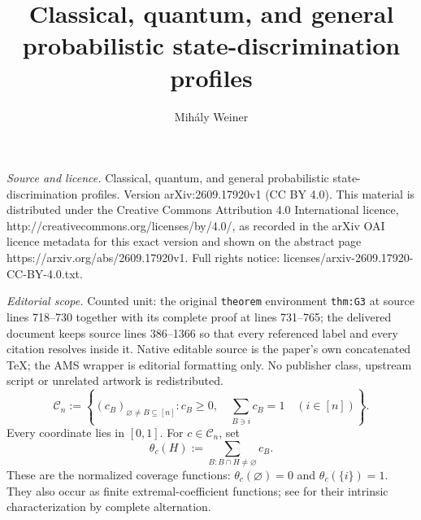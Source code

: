 \documentclass[10pt,a4paper]{amsart}
\newcommand{\1}{\mathbf 1}
\newcommand{\Coeff}{\mathcal C}
\begin{document}
\title[Classical, quantum, and general probabilistic state-discrimi]{Classical, quantum, and general probabilistic state-discrimination profiles}
\author{Mih\'aly Weiner}
\date{}
\maketitle
\noindent\emph{Source and licence.} Classical, quantum, and general probabilistic state-discrimination profiles. Version arXiv:2609.17920v1 (CC BY 4.0). This material is distributed under the Creative Commons Attribution 4.0 International licence, http://creativecommons.org/licenses/by/4.0/, as recorded in the arXiv OAI licence metadata for this exact version and shown on the abstract page https://arxiv.org/abs/2609.17920v1. Full rights notice: licenses/arxiv-2609.17920-CC-BY-4.0.txt.\par\smallskip
\noindent\textit{Editorial scope.} Counted unit: the original \texttt{theorem} environment \texttt{thm:G3} at source lines 718--730 together with its complete proof at lines 731--765; the delivered document keeps source lines 386--1366 so that every referenced label and every citation resolves inside it. Native editable source is the paper's own concatenated TeX; the AMS wrapper is editorial formatting only. No publisher class, upstream script or unrelated artwork is redistributed.
\begin{equation}\label{eq:Coeff}
 \Coeff_n:=\left\{(c_B)_{\varnothing\ne B\subseteq[n]}:
 c_B\ge0,\quad\sum_{B\ni i}c_B=1\quad(i\in[n])\right\}.
\end{equation}
Every coordinate lies in $[0,1]$. For $c\in\Coeff_n$, set
\begin{equation}\label{eq:coverage}
 \theta_c(H):=\sum_{B:B\cap H\ne\varnothing}c_B.
\end{equation}
These are the normalized coverage functions: $\theta_c(\varnothing)=0$ and
$\theta_c(\{i\})=1$. They also occur as finite extremal-coefficient functions;
see \cite{StrokorbSchlather2015} for their intrinsic characterization by
complete alternation.
\end{document}
